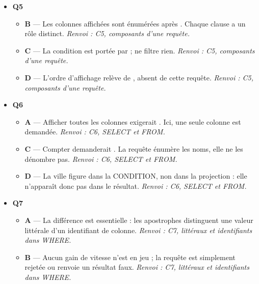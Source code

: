 \begin{itemize}
  \begin{itemize}
    \item \textbf{A} — Le chiffrement relève du service de SÉCURISATION, distinct de la conservation durable des données. \emph{Renvoi : C4, services d'un SGBD.}
    \item \textbf{B} — La rapidité relève du service d'EFFICACITÉ, et aucun système ne promet l'instantanéité. \emph{Renvoi : C4, services d'un SGBD.}
    \item \textbf{C} — L'accès simultané est au contraire permis : c'est le service de gestion de la CONCURRENCE qui l'organise sans conflit. \emph{Renvoi : C4, services d'un SGBD.}
  \end{itemize}
  \item \textbf{Q5}
  \begin{itemize}
    \item \textbf{B} — Les colonnes affichées sont énumérées après . Chaque clause a un rôle distinct. \emph{Renvoi : C5, composants d'une requête.}
    \item \textbf{C} — La condition est portée par  ;  ne filtre rien. \emph{Renvoi : C5, composants d'une requête.}
    \item \textbf{D} — L'ordre d'affichage relève de , absent de cette requête. \emph{Renvoi : C5, composants d'une requête.}
  \end{itemize}
  \item \textbf{Q6}
  \begin{itemize}
    \item \textbf{A} — Afficher toutes les colonnes exigerait . Ici, une seule colonne est demandée. \emph{Renvoi : C6, SELECT et FROM.}
    \item \textbf{C} — Compter demanderait . La requête énumère les noms, elle ne les dénombre pas. \emph{Renvoi : C6, SELECT et FROM.}
    \item \textbf{D} — La ville figure dans la CONDITION, non dans la projection : elle n'apparaît donc pas dans le résultat. \emph{Renvoi : C6, SELECT et FROM.}
  \end{itemize}
  \item \textbf{Q7}
  \begin{itemize}
    \item \textbf{A} — La différence est essentielle : les apostrophes distinguent une valeur littérale d'un identifiant de colonne. \emph{Renvoi : C7, littéraux et identifiants dans WHERE.}
    \item \textbf{B} — Aucun gain de vitesse n'est en jeu ; la requête est simplement rejetée ou renvoie un résultat faux. \emph{Renvoi : C7, littéraux et identifiants dans WHERE.}

\end{itemize}
\end{itemize}
